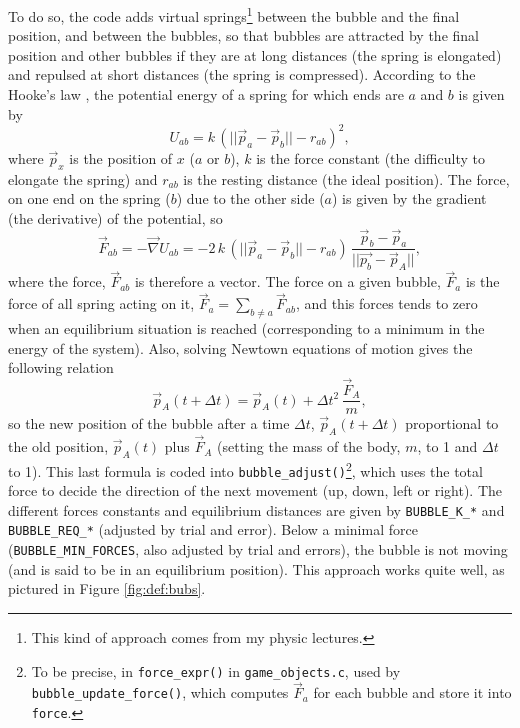 \documentclass[12pt,a4paper]{article}
\newcommand{\cc}[1]{\texttt{#1}}
\begin{document}
To do so, the code adds virtual springs\footnote{This kind of approach comes from my physic lectures.} between the bubble and the final position, and between the bubbles, so that bubbles are attracted by the final position and other bubbles if they are at long distances (the spring is elongated) and repulsed at short distances (the spring is compressed). According to the Hooke's law \cite{hooke}, the potential energy of a spring for which ends are $a$ and $b$ is given by\begin{equation}
U_{ab} = k\,(||\vec{p}_a-\vec{p}_b||-r_{ab})^2,
\end{equation}
where $\vec{p}_x$ is the position of $x$ ($a$ or $b$), $k$ is the force constant (the difficulty to elongate the spring) and $r_{ab}$ is the resting distance (the ideal position). The force, on one end on the spring ($b$) due to the other side ($a$) is given by the gradient (the derivative) of the potential, so\begin{equation}
\vec{F}_{ab}  = - \vec{\nabla} U_{ab} =  -2\,k\,(||\vec{p}_a-\vec{p}_b||-r_{ab})\,\frac{\vec{p}_b-\vec{p}_a}{||\vec{p_b}-\vec{p}_A||},
\end{equation}
where the force, $\vec{F}_{ab}$ is therefore a vector. The force on a given bubble, $\vec{F}_{a}$ is the force of all spring acting on it, $\vec{F}_a = \sum_{b\neq a} \vec{F}_{ab}$, and this forces tends to zero when an equilibrium situation is reached (corresponding to a minimum in the energy of the system). Also, solving Newtown equations of motion gives the following relation\begin{equation}
\vec{p}_A(t+\Delta{t}) = \vec{p}_A(t) + \Delta{t}^2\,\frac{\vec{F}_A}{m},\label{eq:1}
\end{equation}
so the new position of the bubble after a time $\Delta{t}$, $\vec{p}_A(t+\Delta{t})$ proportional to the old position, $\vec{p}_A(t)$ plus $\vec{F}_A$ (setting the mass of the body, $m$, to 1 and $\Delta{t}$ to 1). This last formula is coded into \cc{bubble_adjust()}\footnote{To be precise, in \cc{force_expr()} in \texttt{game\_objects.c}, used by \cc{bubble_update_force()}, which computes $\vec{F}_{a}$ for each bubble and store it into \cc{force}.}, which uses the total force to decide the direction of the next movement (up, down, left or right). The different forces constants and equilibrium distances are given by \cc{BUBBLE_K_*} and \cc{BUBBLE_REQ_*} (adjusted by trial and error). Below a minimal force (\cc{BUBBLE_MIN_FORCES}, also adjusted by trial and errors), the bubble is not moving (and is said to be in an equilibrium position). This approach works quite well, as pictured in Figure \ref{fig:def:bubs}.
\end{document}
